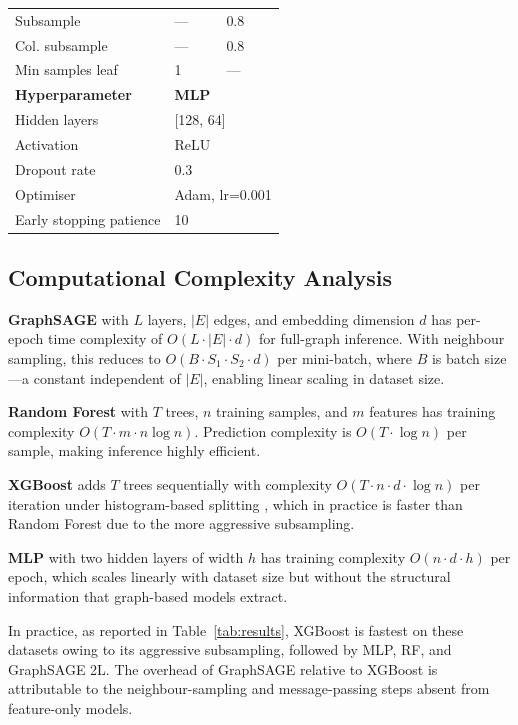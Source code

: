\documentclass[conference]{IEEEtran}
\begin{document}
\begin{table}[htbp]
\begin{tabular}{lll}
Subsample & --- & 0.8 \\
Col. subsample & --- & 0.8 \\
Min samples leaf & 1 & --- \\
\midrule
\textbf{Hyperparameter} & \multicolumn{2}{l}{\textbf{MLP}} \\
\midrule
Hidden layers & \multicolumn{2}{l}{[128, 64]} \\
Activation & \multicolumn{2}{l}{ReLU} \\
Dropout rate & \multicolumn{2}{l}{0.3} \\
Optimiser & \multicolumn{2}{l}{Adam, lr=0.001} \\
Early stopping patience & \multicolumn{2}{l}{10} \\
\bottomrule
\end{tabular}
\end{table}

\subsection{Computational Complexity Analysis}

\textbf{GraphSAGE} with $L$ layers, $|E|$ edges, and embedding dimension $d$
has per-epoch time complexity of $O(L \cdot |E| \cdot d)$ for full-graph
inference. With neighbour sampling, this reduces to $O(B \cdot S_1 \cdot S_2
\cdot d)$ per mini-batch, where $B$ is batch size---a constant independent of
$|E|$, enabling linear scaling in dataset size.

\textbf{Random Forest} with $T$ trees, $n$ training samples, and $m$ features
has training complexity $O(T \cdot m \cdot n \log n)$. Prediction complexity
is $O(T \cdot \log n)$ per sample, making inference highly efficient.

\textbf{XGBoost} adds $T$ trees sequentially with complexity $O(T \cdot n
\cdot d \cdot \log n)$ per iteration under histogram-based splitting
\cite{chen2016xgboost}, which in practice is faster than Random Forest due to
the more aggressive subsampling.

\textbf{MLP} with two hidden layers of width $h$ has training complexity
$O(n \cdot d \cdot h)$ per epoch, which scales linearly with dataset size but
without the structural information that graph-based models extract.

In practice, as reported in Table~\ref{tab:results}, XGBoost is fastest on
these datasets owing to its aggressive subsampling, followed by MLP, RF, and
GraphSAGE 2L. The overhead of GraphSAGE relative to XGBoost is attributable to
the neighbour-sampling and message-passing steps absent from feature-only
models.
\end{document}
